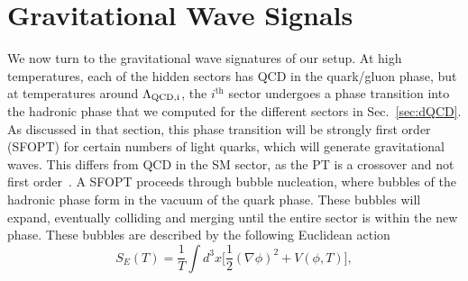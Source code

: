 \documentclass[nofootinbib,twocolumn,preprintnumbers]{revtex4-1}
\begin{document}
\section{Gravitational Wave Signals}
\label{sec:gw}
We now turn to the gravitational wave signatures of our setup. At high temperatures, each of the hidden sectors has QCD in the quark/gluon phase, but at temperatures around $\Lambda_{\rm QCD,i}$, the $i^{\mathrm{th}}$ sector undergoes a phase transition into the hadronic phase that we computed for the different sectors in Sec.~\ref{sec:dQCD}. As discussed in that section, this phase transition will be strongly first order (SFOPT) for certain numbers of light quarks, which will generate gravitational waves. This differs from QCD in the SM sector, as the PT is a crossover and not first order~\cite{Fodor:2001pe}. 
A SFOPT proceeds through bubble nucleation, where bubbles of the hadronic phase form in the vacuum of the quark phase. These bubbles will expand, eventually colliding and merging until the entire sector is within the new phase.  These bubbles are described by the following Euclidean action~\cite{Linde:1981zj}
%
\begin{equation}\label{eqn:EuclideanAction}
S_{E}(T) = \frac{1}{T}\int d^3x \bigg[\frac{1}{2}(\nabla\phi)^2 + V(\phi,T)  \bigg],
\end{equation}
\end{document}
